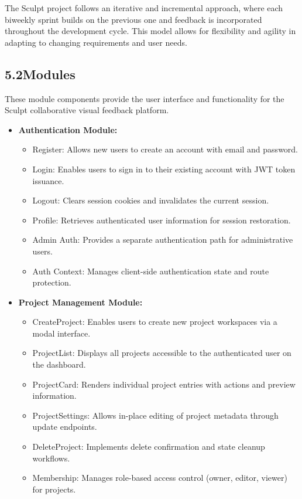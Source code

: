 \documentclass[12pt,a4paper]{article}
\begin{document}
The Sculpt project follows an iterative and incremental approach, where each biweekly sprint builds on the previous one and feedback is incorporated throughout the development cycle. This model allows for flexibility and agility in adapting to changing requirements and user needs.

\subsection{5.2\quad Modules}

These module components provide the user interface and functionality for the Sculpt collaborative visual feedback platform.

\begin{itemize}
    \item[\textbf{$\triangleright$}] \textbf{Authentication Module:}
    \begin{itemize}
        \item Register: Allows new users to create an account with email and password.
        \item Login: Enables users to sign in to their existing account with JWT token issuance.
        \item Logout: Clears session cookies and invalidates the current session.
        \item Profile: Retrieves authenticated user information for session restoration.
        \item Admin Auth: Provides a separate authentication path for administrative users.
        \item Auth Context: Manages client-side authentication state and route protection.
    \end{itemize}

    \item[\textbf{$\triangleright$}] \textbf{Project Management Module:}
    \begin{itemize}
        \item CreateProject: Enables users to create new project workspaces via a modal interface.
        \item ProjectList: Displays all projects accessible to the authenticated user on the dashboard.
        \item ProjectCard: Renders individual project entries with actions and preview information.
        \item ProjectSettings: Allows in-place editing of project metadata through update endpoints.
        \item DeleteProject: Implements delete confirmation and state cleanup workflows.
        \item Membership: Manages role-based access control (owner, editor, viewer) for projects.
    \end{itemize}


\end{itemize}
\end{document}
